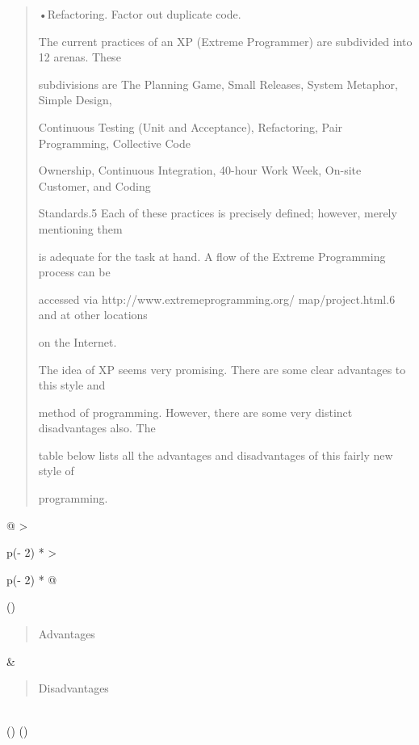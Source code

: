 \documentclass[
]{article}
\begin{document}
\begin{quote}
•Refactoring. Factor out duplicate code.

The current practices of an XP (Extreme Programmer) are subdivided into
12 arenas. These

subdivisions are The Planning Game, Small Releases, System Metaphor,
Simple Design,

Continuous Testing (Unit and Acceptance), Refactoring, Pair Programming,
Collective Code

Ownership, Continuous Integration, 40-hour Work Week, On-site Customer,
and Coding

Standards.5 Each of these practices is precisely defined; however,
merely mentioning them

is adequate for the task at hand. A flow of the Extreme Programming
process can be

accessed via http://www.extremeprogramming.org/ map/project.html.6 and
at other locations

on the Internet.

The idea of XP seems very promising. There are some clear advantages to
this style and

method of programming. However, there are some very distinct
disadvantages also. The

table below lists all the advantages and disadvantages of this fairly
new style of

programming.
\end{quote}

\begin{longtable}[]{@{}
  >{\raggedright\arraybackslash}p{(\columnwidth - 2\tabcolsep) * }
  >{\raggedright\arraybackslash}p{(\columnwidth - 2\tabcolsep) * }@{}}
\toprule()
\begin{minipage}[b]{\linewidth}\raggedright
\begin{quote}
Advantages
\end{quote}
\end{minipage} & \begin{minipage}[b]{\linewidth}\raggedright
\begin{quote}
Disadvantages
\end{quote}
\end{minipage} \\
\midrule()
\endhead
\bottomrule()
\end{longtable}
\end{document}
